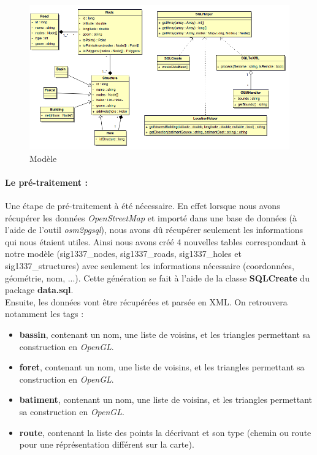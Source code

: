 \documentclass[12pt,a4paper,oneside]{article}
\begin{document}
\begin{figure}[H]
\includegraphics[width=1\textwidth]{../images/modeleDonnees.png}
\caption{Modèle}
\end{figure}

\paragraph{Le pré-traitement : \\}
Une étape de pré-traitement à été nécessaire. En effet lorsque nous avons récupérer les données \textit{OpenStreetMap} et importé dans une base de données (à l'aide de l'outil \textit{osm2pgsql}), nous avons dû récupérer seulement les informations qui nous étaient utiles. Ainsi nous avons créé 4 nouvelles tables correspondant à notre modèle (sig1337\_nodes, sig1337\_roads, sig1337\_holes et sig1337\_structures) avec seulement les informations nécessaire (coordonnées, géométrie, nom, ...). Cette génération se fait à l'aide de la classe \textbf{SQLCreate} du package \textbf{data.sql}. \\
Ensuite, les données vont être récupérées et parsée en XML. On retrouvera notamment les tags :
\begin{itemize}
\item \textbf{bassin}, contenant un nom, une liste de voisins, et les triangles permettant sa construction en \textit{OpenGL}.
\item \textbf{foret}, contenant un nom, une liste de voisins, et les triangles permettant sa construction en \textit{OpenGL}.
\item \textbf{batiment}, contenant un nom, une liste de voisins, et les triangles permettant sa construction en \textit{OpenGL}.
\item \textbf{route}, contenant la liste des points la décrivant et son type (chemin ou route pour une réprésentation différent sur la carte).
\end{itemize}
\end{document}
